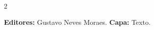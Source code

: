 \documentclass[11pt,a4paper]{article}
\begin{document}
\sloppy

\newcommand{\edicaoMes}{NOVEMBRO}
\newcommand{\edicaoAno}{2026}





\begin{multicols}{2}

%
%
%




{\color{gray}
\textbf{Editores:}
Gustavo Neves Moraes.
\vspace{0.1cm}
\textbf{Capa:}
Texto.
}

\end{multicols}
\end{document}
